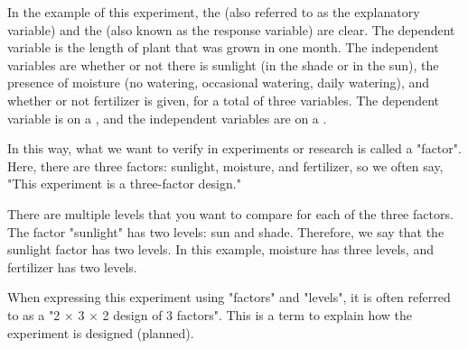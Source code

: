 \documentclass{ltjbook}
\begin{document}
In the example of this experiment, the  (also referred to as the explanatory variable) and the  (also known as the response variable) are clear. The dependent variable is the length of plant that was grown in one month. The independent variables are whether or not there is sunlight (in the shade or in the sun), the presence of moisture (no watering, occasional watering, daily watering), and whether or not fertilizer is given, for a total of three variables. The dependent variable is on a , and the independent variables are on a .

In this way, what we want to verify in experiments or research is called a "factor". Here, there are three factors: sunlight, moisture, and fertilizer, so we often say, "This experiment is a three-factor design."

There are multiple levels that you want to compare for each of the three factors. The factor "sunlight" has two levels: sun and shade. Therefore, we say that the sunlight factor has two levels. In this example, moisture has three levels, and fertilizer has two levels.

When expressing this experiment using "factors" and "levels", it is often referred to as a "2 × 3 × 2 design of 3 factors". This is a term to explain how the experiment is designed (planned).
\end{document}
